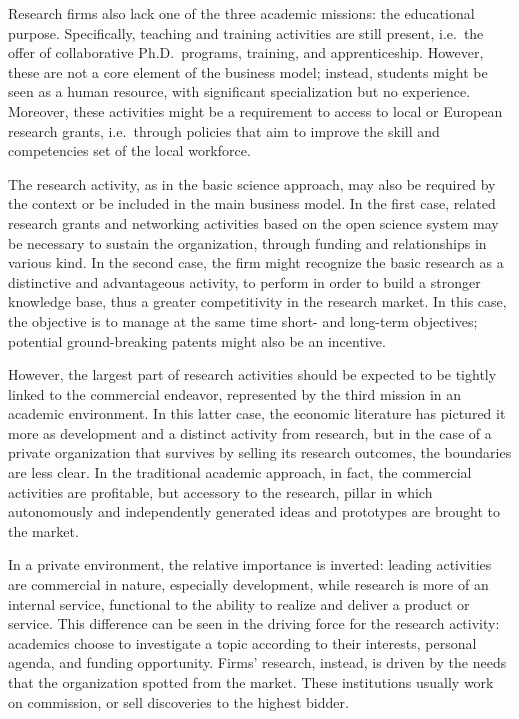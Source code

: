 Research firms also lack one of the three academic missions: the educational purpose. Specifically, teaching and training activities are still present, i.e.\ the offer of collaborative Ph.D.\ programs, training, and apprenticeship. However, these are not a core element of the business model; instead, students might be seen as a human resource, with significant specialization but no experience. Moreover, these activities might be a requirement to access to local or European research grants, i.e.\ through policies that aim to improve the skill and competencies set of the local workforce. 

The research activity, as in the basic science approach, may also be required by the context or be included in the main business model. In the first case, related research grants and networking activities based on the open science system may be necessary to sustain the organization, through funding and relationships in various kind. In the second case, the firm might recognize the basic research as a distinctive and advantageous activity, to perform in order to build a stronger knowledge base, thus a greater competitivity in the research market. In this case, the objective is to manage at the same time short- and long-term objectives; potential ground-breaking patents might also be an incentive.

However, the largest part of research activities should be expected to be tightly linked to the commercial endeavor, represented by the third mission in an academic environment. In this latter case, the economic literature has pictured it more as development and a distinct activity from research, but in the case of a private organization that survives by selling its research outcomes, the boundaries are less clear. In the traditional academic approach, in fact, the commercial activities are profitable, but accessory to the research, pillar in which autonomously and independently generated ideas and prototypes are brought to the market. 

In a private environment, the relative importance is inverted: leading activities are commercial in nature, especially development, while research is more of an internal service, functional to the ability to realize and deliver a product or service. This difference can be seen in the driving force for the research activity: academics choose to investigate a topic according to their interests, personal agenda, and funding opportunity. Firms' research, instead, is driven by the needs that the organization spotted from the market. These institutions usually work on commission, or sell discoveries to the highest bidder. 

